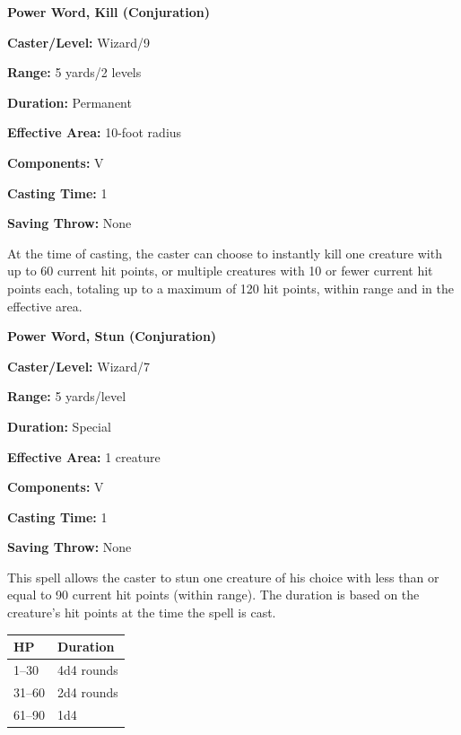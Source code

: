 \begin{multicols}{2}
\noindent
\begin{minipage}{\columnwidth}

\noindent \textbf{Power Word, Kill (Conjuration)}

\noindent \textbf{Caster/Level:} Wizard/9

\noindent \textbf{Range:} 5 yards/2 levels

\noindent \textbf{Duration:} Permanent

\noindent \textbf{Effective Area:} 10-foot radius

\noindent \textbf{Components:} V

\noindent \textbf{Casting Time:} 1

\noindent \textbf{Saving Throw:} None

\end{minipage}

At the time of casting, the caster can choose to instantly kill one creature with up to 60 current hit points, or multiple creatures with 10 or fewer current hit points each, totaling up to a maximum of 120 hit points, within range and in the effective area.  

\vspace{1em}

\noindent
\begin{minipage}{\columnwidth}

\noindent \textbf{Power Word, Stun (Conjuration)}

\noindent \textbf{Caster/Level:} Wizard/7

\noindent \textbf{Range:} 5 yards/level

\noindent \textbf{Duration:} Special

\noindent \textbf{Effective Area:} 1 creature

\noindent \textbf{Components:} V

\noindent \textbf{Casting Time:} 1

\noindent \textbf{Saving Throw:} None

\end{minipage}

This spell allows the caster to stun one creature of his choice with less than or equal to 90 current hit points (within range).  The duration is based on the creature's hit points at the time the spell is cast.

\noindent
\begin{tabular}{|p{}|p{}|}
\hline
HP	& Duration \\
\hline\hline
\rowcolor[gray]{.9}1--30	& 4d4 rounds \\
31--60	& 2d4 rounds \\ 
\rowcolor[gray]{.9}61--90	& 1d4 \\
\hline
\end{tabular}


\end{multicols}
